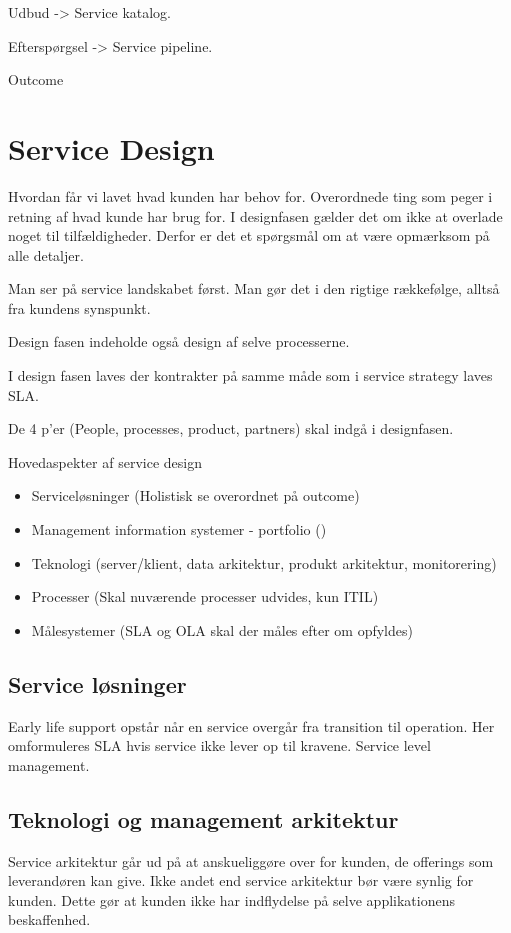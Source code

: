 Udbud -> Service katalog.

Efterspørgsel -> Service pipeline.

Outcome


\section{Service Design}
Hvordan får vi lavet hvad kunden har behov for. Overordnede ting som peger i retning af hvad kunde har brug for. I designfasen gælder det om ikke at overlade noget til tilfældigheder. Derfor er det et spørgsmål om at være opmærksom på alle detaljer.

Man ser på service landskabet først. Man gør det i den rigtige rækkefølge, alltså fra kundens synspunkt.

Design fasen indeholde også design af selve processerne.

I design fasen laves der kontrakter på samme måde som i service strategy laves SLA.

De 4 p'er (People, processes, product, partners) skal indgå i designfasen.

Hovedaspekter af service design
\begin{itemize}
\item Serviceløsninger (Holistisk se overordnet på outcome)
\item Management information systemer - portfolio ()
\item Teknologi (server/klient, data arkitektur, produkt arkitektur, monitorering)
\item Processer (Skal nuværende processer udvides, kun ITIL)
\item Målesystemer (SLA og OLA skal der måles efter om opfyldes)
\end{itemize}

\subsection{Service løsninger}
Early life support opstår når en service overgår fra transition til operation. Her omformuleres SLA hvis service ikke lever op til kravene. Service level management.


\subsection{Teknologi og management arkitektur}
Service arkitektur går ud på at anskueliggøre over for kunden, de offerings som leverandøren kan give. Ikke andet end service arkitektur bør være synlig for kunden. Dette gør at kunden ikke har indflydelse på selve applikationens beskaffenhed.

